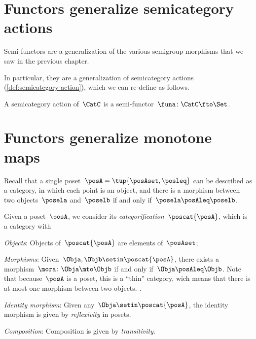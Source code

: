 
\section[\dots as semicategory actions]{Functors generalize semicategory actions}


Semi-functors are a generalization of the various semigroup morphisms that we saw in the previous chapter.


In particular, they are a generalization of semicategory actions (\cref{def:semicategory-action}), which we can re-define as follows.

\begin{ctdefinition}
    A semicategory action of~$\CatC$ is a semi-functor~$\funa\colon \CatC \fto \Set$.
\end{ctdefinition}

\section[\dots as monotone maps]{Functors generalize monotone maps}
\label{sec:posetsarecats}


Recall that a single poset~$\posA=\tup{\posAset, \posleq}$ can be described as a category, in which each point is an object, and there is a morphism between two objects~$\posela$ and~$\poselb$ if and only if~$\posela \posAleq \poselb$.

\begin{ctdefinition}
    Given a poset~$\posA$, we consider its \emph{categorification}~$\poscat{\posA}$, which is a category with
    \begin{compactenum}
        \item \emph{Objects}: Objects of~$\poscat{\posA}$ are elements of~$\posAset$;
        \item \emph{Morphisms}: Given~$\Obja,\Objb\setin \poscat{\posA}$, there exists a morphism~$\mora\colon \Obja\mto \Objb$ if and only if~$\Obja \posAleq \Objb$.
              Note that because~$\posA$ is a poset, this is a ``thin'' category, wich means that there is at most one morphism between two objects.
              .
        \item \emph{Identity morphism}: Given any~$\Obja \setin \poscat{\posA}$, the identity morphism is given by \emph{reflexivity} in posets.
        \item \emph{Composition}: Composition is given by \emph{transitivity}.
    \end{compactenum}
\end{ctdefinition}

